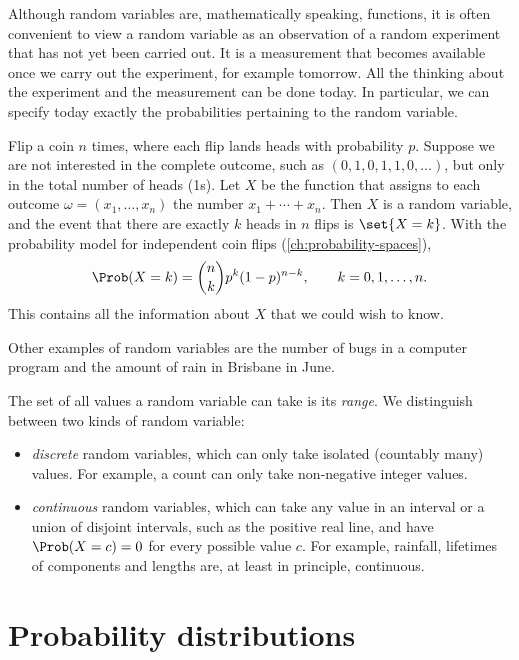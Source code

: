 Although random variables are, mathematically speaking, functions, it is often convenient to view a random variable as an observation of a random experiment that has not yet been carried out. It is a measurement that becomes available once we carry out the experiment, for example tomorrow. All the thinking about the experiment and the measurement can be done today. In particular, we can specify today exactly the probabilities pertaining to the random variable.

\begin{example}\label{ex:number-of-heads}
Flip a coin $n$ times, where each flip lands heads with probability $p$. Suppose we are not interested in the complete outcome, such as $(0, 1, 0, 1, 1, 0, \ldots)$, but only in the total number of heads (1s). Let $X$ be the function that assigns to each outcome $\omega = (x_1, \ldots, x_n)$ the number $x_1 + \cdots + x_n$. Then $X$ is a random variable, and the event that there are exactly $k$ heads in $n$ flips is $\set{X = k}$. With the probability model for independent coin flips (\cref{ch:probability-spaces}),
\[
  \Prob(X = k) = \binom{n}{k} p^k (1 - p)^{n-k}, \qquad k = 0, 1, \ldots, n.
\]
This contains all the information about $X$ that we could wish to know.
\end{example}

Other examples of random variables are the number of bugs in a computer program and the amount of rain in Brisbane in June.

The set of all values a random variable can take is its \emph{range}. We distinguish between two kinds of random variable:
\begin{itemize}
  \item \emph{discrete} random variables, which can only take isolated (countably many) values. For example, a count can only take non-negative integer values.
  \item \emph{continuous} random variables, which can take any value in an interval or a union of disjoint intervals, such as the positive real line, and have $\Prob(X = c) = 0$ for every possible value $c$. For example, rainfall, lifetimes of components and lengths are, at least in principle, continuous.
\end{itemize}

\section{Probability distributions}\label{sec:distribution}

